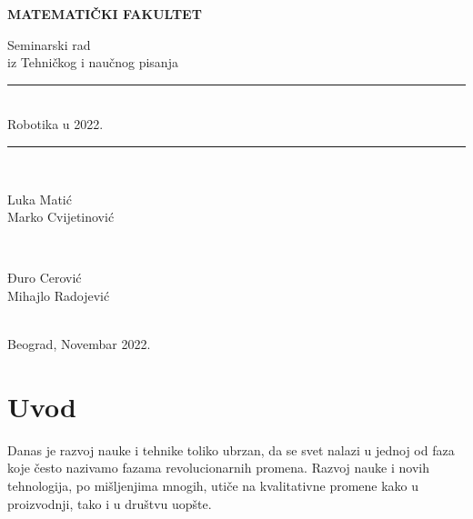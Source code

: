 \documentclass{article}
\newcommand{\HRule}{\rule{\linewidth}{0.5mm}}
\begin{document}
	\vspace*{5cm}
	\thispagestyle{empty}
	\centerline{\huge \textbf{MATEMATIČKI FAKULTET}}
	\vspace{2cm}
	
	\begin{center}
		
		{\Large Seminarski rad}\\
		{\Large	iz Tehničkog i naučnog pisanja}\\
		\Huge\HRule\\[0.4cm] %
		{Robotika u 2022.}\\
		\HRule \\[20pt] %
		\begin{minipage}{0.4\textwidth}
			\begin{flushleft} \large
				{\Large Luka Matić}\\
				{\Large Marko Cvijetinović}
			\end{flushleft}
		\end{minipage}
		~
		\begin{minipage}{0.4\textwidth}
			\begin{flushright} \large
				{\Large Đuro Cerović} \\
				{\Large Mihajlo Radojević}\\ 
			\end{flushright}
		\end{minipage}\\[5cm]
		\Large{Beograd, Novembar 2022.}
	\end{center}
	\pagebreak
 \begin{abstract}
 Robotika je nova nauka, obuhvata mnoge naučne oblasti i bavi se robotima i programiranjem istih. Mašinstvo, elektrotehnika i računarstvo su osnovne discipline uključene u robotiku.
 \\Tehnologije robota brzo napreduju, samim tim se i ljudski život danas razlikuje u odnosu na ranije. Ovaj rad ima za cilj da objasni šta je robotika, kako različite vrste robota funkcionišu i kako to razvoj robotike i robota utiče na svakodnevni život.
 
     
      
    
 \end{abstract}
	\tableofcontents
    \pagebreak
	\section{Uvod}
	
	Danas je razvoj nauke i tehnike toliko ubrzan, da se svet nalazi u jednoj od faza koje često nazivamo fazama revolucionarnih promena. Razvoj nauke i novih tehnologija, po mišljenjima mnogih, utiče na kvalitativne promene kako u proizvodnji, tako i u društvu uopšte.
	
\end{document}
